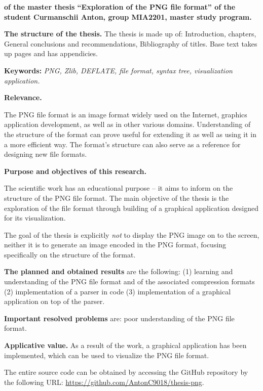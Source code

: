 \documentclass[a4paper,12pt]{report}
\newcommand{\thesisTitleEng}{Exploration of the PNG file format}
\newcommand{\uniGroupName}{MIA2201}
\newcommand{\authorName}{Curmanschii Anton} %
\newcommand{\thesisType}{master} %
\newcommand{\programulDeStudii}{master} %
\newcommand{\github}{\url{https://github.com/AntonC9018/thesis-png}}
\begin{document}
\clearpage
{}

\textbf{of the \thesisType{} thesis  ``\thesisTitleEng'' of the student \authorName{}, group \uniGroupName{}, \programulDeStudii{} study program.}

\textbf{The structure of the thesis.}
The thesis is made up of: Introduction, \chapterCount{} chapters,
General conclusions and recommendations, Bibliography of \bibliographyEntryCount{} titles.
Base text takes up \usefulPageCount{} pages and has \anexeCount{} appendicies.

\textbf{Keywords:}
\textit{\acs{PNG}, Zlib, DEFLATE, file format, syntax tree, visualization application.}

\textbf{Relevance.}

The \acs{PNG} file format is an image format widely used on the Internet,
graphics application development, as well as in other various domains.
Understanding of the structure of the format can prove useful for extending it
as well as using it in a more efficient way.
The format's structure can also serve as a reference for designing new file formats.

\textbf{Purpose and objectives of this research.}

The scientific work has an educational purpose
-- it aims to inform on the structure of the \acs{PNG} file format.
The main objective of the thesis is the exploration of the file format
through building of a graphical application designed for its visualization.

The goal of the thesis is explicitly \textit{not} to display the \acs{PNG} image on to the screen,
neither it is to generate an image encoded in the \acs{PNG} format, focusing specifically
on the structure of the format.

\textbf{The planned and obtained results} are the following:
(1) learning and understanding of the \acs{PNG} file format and of the associated compression formats
(2) implementation of a parser in code
(3) implementation of a graphical application on top of the parser.

\textbf{Important resolved problems} are: poor understanding of the \acs{PNG} file format.

\textbf{Applicative value.} 
As a result of the work, a graphical application has been implemented,
which can be used to visualize the \acs{PNG} file format.

The entire source code can be obtained by accessing the GitHub repository
by the following URL: \github. 
\end{document}
